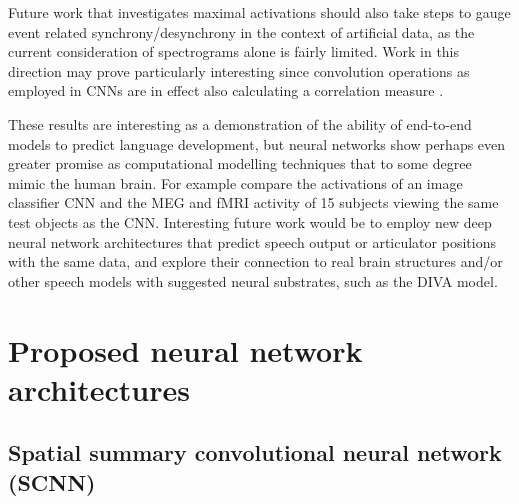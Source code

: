 \documentclass[fleqn,10pt]{wlscirep}
\begin{document}
Future work that investigates maximal activations should also take steps to gauge event related synchrony/desynchrony in the context of artificial data, as the current consideration of spectrograms alone is fairly limited. Work in this direction may prove particularly interesting since convolution operations as employed in CNNs are in effect also calculating a correlation measure \cite{GravesRNNBook}.

These results are interesting as a demonstration of the ability of end-to-end models to predict language development, but neural networks show perhaps even greater promise as computational modelling techniques that to some degree mimic the human brain. For example \cite{cichy2016} compare the activations of an image classifier CNN and the MEG and fMRI activity of 15 subjects viewing the same test objects as the CNN. Interesting future work would be to employ new deep neural network architectures that predict speech output or articulator positions with the same data, and explore their connection to real brain structures and/or other speech models with suggested neural substrates, such as the DIVA model\cite{Guenther2005}.



\section*{Proposed neural network architectures}

\subsection*{Spatial summary convolutional neural network (SCNN)} \label{sec:scnn}
\end{document}
